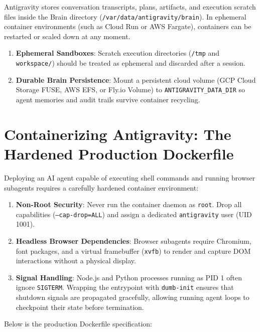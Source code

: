 \documentclass[11pt,a4paper,oneside]{book}
\begin{document}
\begin{conceptbox}
Antigravity stores conversation transcripts, plans, artifacts, and execution scratch files inside the Brain directory (\texttt{/var/data/antigravity/brain}). In ephemeral container environments (such as Cloud Run or AWS Fargate), containers can be restarted or scaled down at any moment. 
\begin{enumerate}
    \item \textbf{Ephemeral Sandboxes}: Scratch execution directories (\texttt{/tmp} and \texttt{workspace/}) should be treated as ephemeral and discarded after a session.
    \item \textbf{Durable Brain Persistence}: Mount a persistent cloud volume (GCP Cloud Storage FUSE, AWS EFS, or Fly.io Volume) to \texttt{ANTIGRAVITY\_DATA\_DIR} so agent memories and audit trails survive container recycling.
\end{enumerate}
\end{conceptbox}

\section{Containerizing Antigravity: The Hardened Production Dockerfile}
Deploying an AI agent capable of executing shell commands and running browser subagents requires a carefully hardened container environment:
\begin{enumerate}
    \item \textbf{Non-Root Security}: Never run the container daemon as \texttt{root}. Drop all capabilities (\texttt{--cap-drop=ALL}) and assign a dedicated \texttt{antigravity} user (UID 1001).
    \item \textbf{Headless Browser Dependencies}: Browser subagents require Chromium, font packages, and a virtual framebuffer (\texttt{xvfb}) to render and capture DOM interactions without a physical display.
    \item \textbf{Signal Handling}: Node.js and Python processes running as PID 1 often ignore \texttt{SIGTERM}. Wrapping the entrypoint with \texttt{dumb-init} ensures that shutdown signals are propagated gracefully, allowing running agent loops to checkpoint their state before termination.
\end{enumerate}

Below is the production Dockerfile specification:
\end{document}
